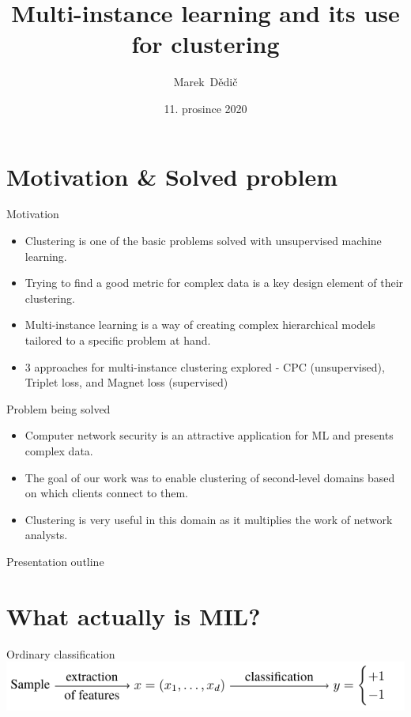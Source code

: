 \documentclass[10pt]{beamer}
\title[MIL and its use for clustering]
{
	Multi-instance learning and its use for clustering
}
\date[11. 12. 2020]{11. prosince 2020}
\author[Marek Dědič]
{
	Marek~Dědič\inst{1}
}
\institute[FJFI ČVUT]
{
	\inst{1} ČVUT v Praze, Fakulta jaderná a fyzikálně inženýrská
}
\begin{document}
\begin{frame}
	\titlepage
\end{frame}


\section{Motivation \& Solved problem}

\begin{frame}{Motivation}
	\begin{itemize}
		\item Clustering is one of the basic problems solved with unsupervised machine learning.
		\item Trying to find a good metric for complex data is a key design element of their clustering.
		\item Multi-instance learning is a way of creating complex hierarchical models tailored to a specific problem at hand.
		\item 3 approaches for multi-instance clustering explored - CPC (unsupervised), Triplet loss, and Magnet loss (supervised)
	\end{itemize}
\end{frame}

\begin{frame}{Problem being solved}
	\begin{itemize}
		\item Computer network security is an attractive application for ML and presents complex data.
		\item The goal of our work was to enable clustering of second-level domains based on which clients connect to them.
		\item Clustering is very useful in this domain as it multiplies the work of network analysts.
	\end{itemize}
\end{frame}

\begin{frame}{Presentation outline}
	\tableofcontents
\end{frame}

\section{What actually is MIL?}

\begin{frame}{Ordinary classification}
	\centering
	\includegraphics{images/ordinary_learning/ordinary_learning.pdf}
\end{frame}
\end{document}
